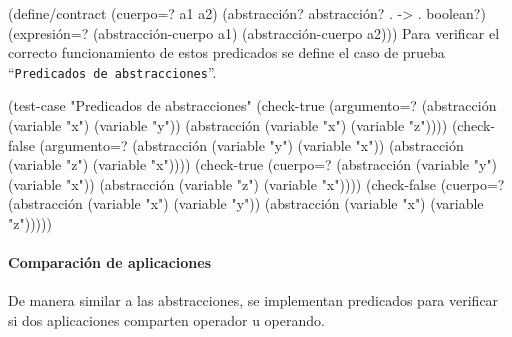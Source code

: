 \documentclass[10pt,oneside,openany,letterpaper]{book}
\begin{document}
(define/contract (cuerpo=? a1 a2)
  (abstracción? abstracción? . -> . boolean?)
  (expresión=? (abstracción-cuerpo a1)
               (abstracción-cuerpo a2)))
\eatline
{}\nwendcode{}\nwdocspar
Para verificar el correcto funcionamiento de estos predicados se define el caso de prueba ``{\tt{}Predicados\ de\ abstracciones}''.

\nwenddocs{}\plusendmoddef
(test-case "Predicados de abstracciones"
  (check-true (argumento=? (abstracción (variable "x") (variable "y"))
                           (abstracción (variable "x") (variable "z"))))
  (check-false (argumento=? (abstracción (variable "y") (variable "x"))
                            (abstracción (variable "z") (variable "x"))))
  (check-true (cuerpo=? (abstracción (variable "y") (variable "x"))
                        (abstracción (variable "z") (variable "x"))))
  (check-false (cuerpo=? (abstracción (variable "x") (variable "y"))
                         (abstracción (variable "x") (variable "z")))))
\nwendcode{}\nwdocspar

\paragraph{Comparación de aplicaciones} De manera similar a las abstracciones, se implementan predicados para verificar si dos aplicaciones comparten operador u operando.
\end{document}
